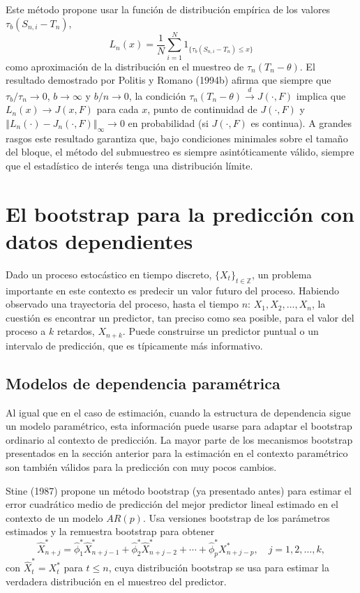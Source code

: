 \documentclass[
]{book}
\theoremstyle{break}
\theoremstyle{nonumberplain}
\begin{document}
Este método propone usar la función de distribución empírica de los
valores \(\tau _{b}(S_{n,i}-T_n)\),
\[L_n(x)=\frac{1}{N}\sum_{i=1}^{N}1_{\{\tau _{b}(S_{n,i}-T_n)\leq x\}}\]
como aproximación de la distribución en el muestreo de \(\tau_n(T_n-\theta )\).
El resultado demostrado por Politis y Romano (1994b) afirma que siempre que
\(\tau _{b}/\tau _n\rightarrow 0\), \(b \rightarrow \infty\) y
\(b/n\rightarrow 0\), la condición \(\tau _n(T_n-\theta )\overset{d}{\rightarrow}J(\cdot ,F)\) implica que \(L_n(x)\rightarrow
J(x,F)\) para cada \(x\), punto de continuidad de \(J(\cdot ,F)\) y
\(\left\Vert
L_n(\cdot )-J_n(\cdot ,F)\right\Vert _{\infty }\rightarrow 0\) en
probabilidad (si \(J(\cdot ,F)\) es continua). A grandes rasgos este
resultado garantiza que, bajo condiciones minimales sobre el tamaño del
bloque, el método del submuestreo es siempre asintóticamente válido,
siempre que el estadístico de interés tenga una distribución límite.

\section{El bootstrap para la predicción con datos dependientes}\label{el-bootstrap-para-la-predicciuxf3n-con-datos-dependientes}

Dado un proceso estocástico en tiempo discreto,
\(\{X_{t}\}_{t\in \mathbb{
Z}}\), un problema importante en este contexto es predecir un valor
futuro del proceso. Habiendo observado una trayectoria del proceso,
hasta el tiempo \(n\): \(X_1,X_2,\ldots ,X_n\), la cuestión es
encontrar un predictor, tan preciso como sea posible, para el valor del
proceso a \(k\) retardos,
\(X_{n+k}\). Puede construirse un predictor puntual o un intervalo de
predicción, que es típicamente más informativo.

\subsection{Modelos de dependencia paramétrica}\label{modelos-de-dependencia-paramuxe9trica}

Al igual que en el caso de estimación, cuando la estructura de
dependencia sigue un modelo paramétrico, esta información puede usarse
para adaptar el bootstrap ordinario al contexto de predicción. La mayor
parte de los mecanismos bootstrap presentados en la sección anterior
para la estimación en el contexto paramétrico son también válidos para
la predicción con muy pocos cambios.

Stine (1987) propone un método bootstrap (ya presentado antes) para
estimar el error cuadrático medio de predicción del mejor predictor
lineal estimado en el contexto de un modelo \(AR(p)\). Usa versiones
bootstrap de los parámetros estimados y la remuestra bootstrap para
obtener
\[\widehat{X}_{n+j}^{\ast}=\widehat{\phi}_1^{\ast}\widehat{X}
_{n+j-1}^{\ast}+\widehat{\phi}_2^{\ast}\widehat{X}_{n+j-2}^{\ast
}+\cdots +\widehat{\phi}_{p}^{\ast}X_{n+j-p}^{\ast},\quad j=1,2,\ldots ,k,\]con
\(\widehat{X}_{t}^{\ast}=X_{t}^{\ast}\) para \(t\leq n\), cuya
distribución bootstrap se usa para estimar la verdadera distribución en
el muestreo del predictor.
\end{document}
